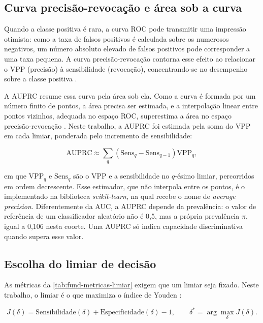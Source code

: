 \subsection{Curva precisão-revocação e área sob a curva}
\label{subsec:fund-ap}

Quando a classe positiva é rara, a curva ROC pode transmitir uma impressão
otimista: como a taxa de falsos positivos é calculada sobre os numerosos
negativos, um número absoluto elevado de falsos positivos pode corresponder a
uma taxa pequena. A curva precisão-revocação contorna esse efeito ao
relacionar o \gls{VPP} (precisão) à sensibilidade (revocação),
concentrando-se no desempenho sobre a classe positiva
\cite{saito2015precision, davis2006relationship}.

A \gls{AUPRC} resume essa curva pela área sob ela. Como a curva é formada por
um número finito de pontos, a área precisa ser estimada, e a interpolação
linear entre pontos vizinhos, adequada no espaço ROC, superestima a área no
espaço precisão-revocação \cite{davis2006relationship}. Neste trabalho, a
\gls{AUPRC} foi estimada pela soma do \gls{VPP} em cada limiar, ponderada
pelo incremento de sensibilidade:

\begin{equation}
	\mathrm{AUPRC} \approx \sum_{q} \left( \mathrm{Sens}_q - \mathrm{Sens}_{q-1} \right) \mathrm{VPP}_q,
	\label{eq:ap}
\end{equation}

\noindent
em que $\mathrm{VPP}_q$ e $\mathrm{Sens}_q$ são o \gls{VPP} e a sensibilidade
no $q$-ésimo limiar, percorridos em ordem decrescente. Esse estimador, que
não interpola entre os pontos, é o implementado na biblioteca
\textit{scikit-learn}, na qual recebe o nome de \textit{average precision}.
Diferentemente da \gls{AUC}, a \gls{AUPRC} depende da prevalência: o valor de
referência de um classificador aleatório não é 0,5, mas a própria
prevalência $\pi$, igual a 0,106 nesta coorte. Uma \gls{AUPRC} só indica
capacidade discriminativa quando supera esse valor.

\subsection{Escolha do limiar de decisão}
\label{subsec:fund-youden}

As métricas da \autoref{tab:fund-metricas-limiar} exigem que um limiar seja
fixado. Neste trabalho, o limiar é o que maximiza o índice de Youden
\cite{youden1950index}:

\begin{equation}
	J(\delta) = \mathrm{Sensibilidade}(\delta) + \mathrm{Especificidade}(\delta) - 1,
	\qquad
	\delta^{*} = \arg\max_{\delta} J(\delta).
	\label{eq:youden}
\end{equation}

